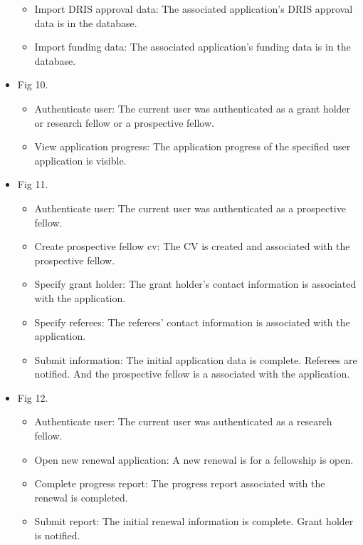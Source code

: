\documentclass[12pt]{article}
\begin{document}
\begin{itemize}
\begin{itemize}
			\item Import DRIS approval data: The associated application's DRIS approval data is in the database.
			\item Import funding data: The associated application's funding data is in the database.				
		\end{itemize}
	\item Fig 10.
		\begin{itemize}
			\item Authenticate user: The current user was authenticated as a grant holder or research fellow or a prospective fellow.
			\item View application progress: The application progress of the specified user application is visible.									
		\end{itemize}				
		
	\item Fig 11.
		\begin{itemize}
			\item Authenticate user: The current user was authenticated as a prospective fellow.
			\item Create prospective fellow cv: The CV is created and associated with the prospective fellow.
			\item Specify grant holder: The grant holder's contact information is associated with the application.
			\item Specify referees: The referees' contact information is associated with the application.
			\item Submit information: The initial application data is complete. Referees are notified. And the prospective fellow is a associated with the application.				
		\end{itemize}
	
	\item Fig 12.
		\begin{itemize}
			\item Authenticate user: The current user was authenticated as a research fellow.
			\item Open new renewal application: A new renewal is for a fellowship is open.
			\item Complete progress report: The progress report associated with	the renewal is completed.		
			\item Submit report: The initial renewal information is complete. Grant holder is notified.											
		\end{itemize}
	

\end{itemize}
\end{document}
